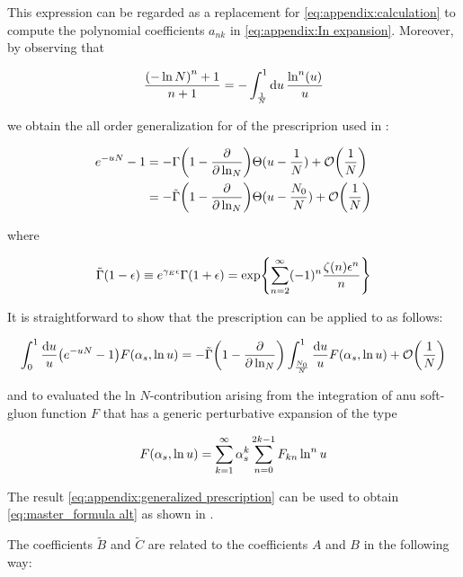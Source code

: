 \documentclass[../main.tex]{subfiles}
\begin{document}
This expression can be regarded as a replacement for \cref{eq:appendix:calculation} to compute the polynomial coefficients $a_{nk}$ 
in \cref{eq:appendix:In expansion}. Moreover, by observing that 

\begin{equation}
    \frac{ \qty(-\ln N)^n+1}{n+1} = -\int_{\frac{1}{N}}^1 \dd{u} \frac{\ln^n(u)}{u}
\end{equation}

we obtain the all order generalization for of the prescriprion used in \cite{CATANI19933}:

\begin{align}
    e^{-uN}-1 &= -\Gamma\qty(1-\pdv{\ln_N}) \Theta(u-\frac{1}{N}) + \order{\frac{1}{N}}\\
              &=  -\tilde{\Gamma}\qty(1-\pdv{\ln_N}) \Theta(u-\frac{N_0}{N}) + \order{\frac{1}{N}} 
\end{align}

where 

\begin{equation}
    \tilde{\Gamma}\qty(1-\epsilon) \equiv e^{\gamma_E \epsilon} \Gamma(1+\epsilon) = \exp{\sum_{n=2}^\infty (-1)^n \frac{ \zeta(n) \epsilon^n}{n}}
\end{equation}

It is straightforward to show that the prescription can be applied to as follows:

\begin{equation} \label{eq:appendix:generalized prescription}
    \int_0^1 \frac{\dd{u}}{u} \qty(e^{-u N} - 1) F\qty(\alpha_s , \ln u) = -\tilde{\Gamma}\qty(1-\pdv{\ln_N}) \int_{\frac{N_0}{N}}^1 \frac{\dd{u}}{u} F\qty(\alpha_s , \ln u) + \order{\frac{1}{N}}
\end{equation}
    
and to evaluated the ln $N$-contribution arising from the integration of anu soft-gluon function $F$ that has a generic perturbative expansion of the type

\begin{equation}
    F\qty(\alpha_s , \ln u) = \sum_{k=1}^\infty \alpha_s^k \sum_{n=0}^{2k-1} F_{kn}\ln^n u
\end{equation}

The result \cref{eq:appendix:generalized prescription} can be used to obtain \cref{eq:master_formula alt} as shown in \cite{Catani_2003_appendix}.

The coefficients $\tilde{B}$ and $\tilde{C}$ are related to the coefficients $A$ and $B$ in the following way:
\end{document}

